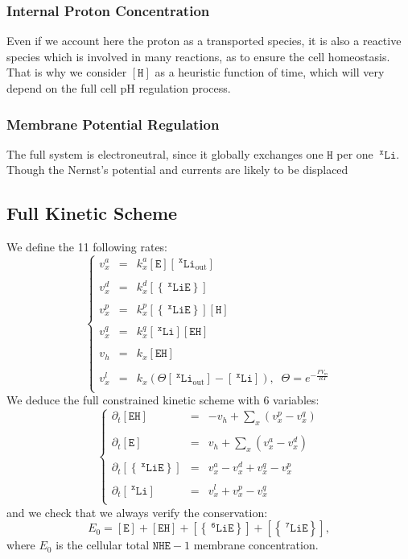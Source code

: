 \documentclass[aps,onecolumn,10pt]{revtex4}
\newcommand{\mychem}[1]{\mathtt{#1}}
\newcommand{\myconc}[1]{\left\lbrack{#1}\right\rbrack}
\newcommand{\spLi}[1]{{~^{\mychem{#1}}\mychem{Li}}}
\newcommand{\Li}[1]{\myconc{\spLi{#1}}}
\newcommand{\spEout}{\mychem{E}}
\newcommand{\Eout}{\myconc{\spEout}}
\newcommand{\spLiE}[1]{\left\lbrace\spLi{#1}\spEout\right\rbrace}
\newcommand{\LiE}[1]{\myconc{\spLiE{#1}}}
\newcommand{\spLiOut}[1]{{\spLi{#1}}_{\mathrm{out}}}
\newcommand{\LiOut}[1]{\myconc{\spLiOut{#1}}}
\newcommand{\spEHin}{\mychem{EH}}
\newcommand{\EHin}{\myconc{\spEHin}}
\newcommand{\spproton}{\mychem{H}}
\newcommand{\proton}{\myconc{\spproton}}
\newcommand{\NHE}[1]{\mychem{NHE}{\!-\!#1}}
\newcommand{\todo}[1]{\framebox{\textbf{\color{WildStrawberry}{#1}}}}
\begin{document}
\subsubsection{Internal Proton Concentration}
Even if we account here the proton as a transported species, it is also a reactive species which is involved in many reactions, as to ensure the cell homeostasis\todo{ref}. That is why we consider $\proton$ as a heuristic function of time, which will very depend on the full cell pH regulation process.

\subsubsection{Membrane Potential Regulation}
The full system is electroneutral, since it globally exchanges one $\spproton$ per one $\spLi{x}$. Though the Nernst's potential and currents are likely to be displaced \todo{more explanations?}

\subsection{Full Kinetic Scheme}
We define the 11 following rates:
\begin{equation}
	\label{eq:rates}
\left\lbrace
\begin{array}{rcl}
	v^a_x & = & k^a_x \Eout \LiOut{x} \\
	\\
	v^d_x & = & k^d_x \LiE{x} \\
	\\
	v^p_x & = & k^p_x \LiE{x} \proton\\
	\\
	v^q_x & = & k^q_x \Li{x} \EHin\\
	\\
	v_h   & = & k_x \EHin\\
	\\
	v^l_x & = & k_x\left(\Theta \LiOut{x} - \Li{x}\right),\;\;\Theta = e^{-\frac{FV_m}{RT}}\\
\end{array}
\right.
\end{equation}
We deduce the full constrained kinetic scheme with 6 variables:
\begin{equation}
	\label{eq:full}
\left\lbrace
\begin{array}{rcl}
\partial_t \EHin & = & -v_h + \sum_x\left(v^p_x - v^q_x\right)\\
\\
\partial_t \Eout & = & v_h + \sum_x(v^a_x -v^d_x)\\
\\
\partial_t \LiE{x} & = & v^a_x -v^d_x + v^q_x -v^p_x\\
\\
\partial_t \Li{x}  & = & v^l_x + v^p_x - v^q_x\\
\end{array}
\right.
\end{equation}
and we check that we always verify the conservation:
\begin{equation}
	E_0  =  \Eout + \EHin + \LiE{6} + \LiE{7},
\end{equation}
where $E_0$ is the cellular total $\NHE{1}$ membrane concentration.
\end{document}

